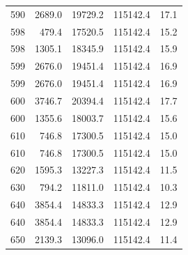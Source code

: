 \begin{longtable}{rrrrr}
    590 & \num{2689.0} & \num{19729.2} & \num{115142.4} & 17.1 \\
    598 & \num{479.4} & \num{17520.5} & \num{115142.4} & 15.2 \\
    598 & \num{1305.1} & \num{18345.9} & \num{115142.4} & 15.9 \\
    599 & \num{2676.0} & \num{19451.4} & \num{115142.4} & 16.9 \\
    599 & \num{2676.0} & \num{19451.4} & \num{115142.4} & 16.9 \\
    600 & \num{3746.7} & \num{20394.4} & \num{115142.4} & 17.7 \\
    600 & \num{1355.6} & \num{18003.7} & \num{115142.4} & 15.6 \\
    610 & \num{746.8} & \num{17300.5} & \num{115142.4} & 15.0 \\
    610 & \num{746.8} & \num{17300.5} & \num{115142.4} & 15.0 \\
    620 & \num{1595.3} & \num{13227.3} & \num{115142.4} & 11.5 \\
    630 & \num{794.2} & \num{11811.0} & \num{115142.4} & 10.3 \\
    640 & \num{3854.4} & \num{14833.3} & \num{115142.4} & 12.9 \\
    640 & \num{3854.4} & \num{14833.3} & \num{115142.4} & 12.9 \\
    650 & \num{2139.3} & \num{13096.0} & \num{115142.4} & 11.4 \\
\end{longtable}
\endgroup
